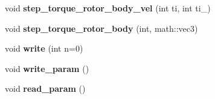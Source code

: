 \begin{DoxyCompactItemize}
\item 
\hypertarget{classAttitude_a3acffc90c62c76fe37ce352e090f804f}{void {\bfseries step\-\_\-torque\-\_\-rotor\-\_\-body\-\_\-vel} (int ti, int ti\-\_)}\label{classAttitude_a3acffc90c62c76fe37ce352e090f804f}

\item 
\hypertarget{classAttitude_a303e24774c3086915d85803be88a5e27}{void {\bfseries step\-\_\-torque\-\_\-rotor\-\_\-body} (int, math\-::vec3)}\label{classAttitude_a303e24774c3086915d85803be88a5e27}

\item 
\hypertarget{classAttitude_a8e46df6befc26497fe52c7a727da2154}{void {\bfseries write} (int n=0)}\label{classAttitude_a8e46df6befc26497fe52c7a727da2154}

\item 
\hypertarget{classAttitude_a82ea007a5d6b22c5016308b982816459}{void {\bfseries write\-\_\-param} ()}\label{classAttitude_a82ea007a5d6b22c5016308b982816459}

\item 
\hypertarget{classAttitude_a628672fe0bc80ab2451362a519bfc81f}{void {\bfseries read\-\_\-param} ()}\label{classAttitude_a628672fe0bc80ab2451362a519bfc81f}

\end{DoxyCompactItemize}
